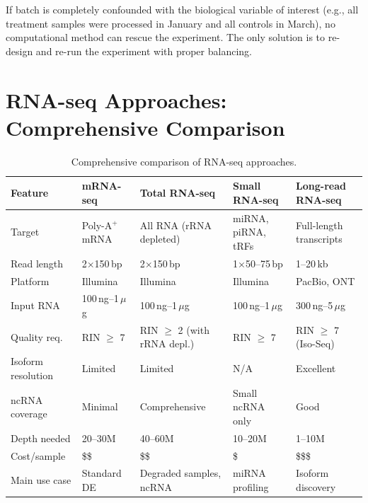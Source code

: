 \begin{warningbox}
If batch is completely confounded with the biological variable of interest
(e.g., all treatment samples were processed in January and all controls in
March), no computational method can rescue the experiment. The only solution
is to re-design and re-run the experiment with proper balancing.
\end{warningbox}


\section{RNA-seq Approaches: Comprehensive Comparison}
\label{sec:rnaseq:comparison}

\begin{table}[htbp]
\centering
\caption{Comprehensive comparison of RNA-seq approaches.}
\label{tab:rnaseq:approaches}
\small
\begin{tabularx}{\textwidth}{lXXXX}
\toprule
\textbf{Feature} & \textbf{mRNA-seq} & \textbf{Total RNA-seq} & \textbf{Small RNA-seq} & \textbf{Long-read RNA-seq} \\
\midrule
Target & Poly-A$^+$ mRNA & All RNA (rRNA depleted) & miRNA, piRNA, tRFs & Full-length transcripts \\
Read length & 2$\times$150\,bp & 2$\times$150\,bp & 1$\times$50--75\,bp & 1--20\,kb \\
Platform & Illumina & Illumina & Illumina & PacBio, ONT \\
Input RNA & 100\,ng--1\,$\mu$g & 100\,ng--1\,$\mu$g & 100\,ng--1\,$\mu$g & 300\,ng--5\,$\mu$g \\
Quality req. & RIN $\geq$ 7 & RIN $\geq$ 2 (with rRNA depl.) & RIN $\geq$ 7 & RIN $\geq$ 7 (Iso-Seq) \\
Isoform resolution & Limited & Limited & N/A & Excellent \\
ncRNA coverage & Minimal & Comprehensive & Small ncRNA only & Good \\
Depth needed & 20--30M & 40--60M & 10--20M & 1--10M \\
Cost/sample & \$\$  & \$\$ & \$ & \$\$\$ \\
Main use case & Standard DE & Degraded samples, ncRNA & miRNA profiling & Isoform discovery \\
\bottomrule
\end{tabularx}
\end{table}


